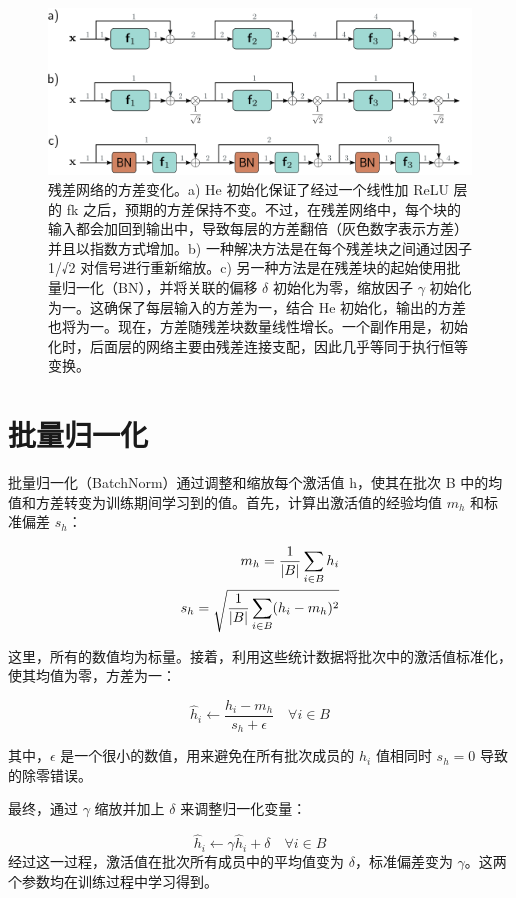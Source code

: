 \begin{figure}[ht!]
\centering
\includegraphics[width=0.7\linewidth]{png/chapter11/ResidualVariance.png}
\caption{残差网络的方差变化。a) He 初始化保证了经过一个线性加 ReLU 层的 fk 之后，预期的方差保持不变。不过，在残差网络中，每个块的输入都会加回到输出中，导致每层的方差翻倍（灰色数字表示方差）并且以指数方式增加。b) 一种解决方法是在每个残差块之间通过因子 1/√2 对信号进行重新缩放。c) 另一种方法是在残差块的起始使用批量归一化（BN），并将关联的偏移 \(\delta\) 初始化为零，缩放因子 \(\gamma\) 初始化为一。这确保了每层输入的方差为一，结合 He 初始化，输出的方差也将为一。现在，方差随残差块数量线性增长。一个副作用是，初始化时，后面层的网络主要由残差连接支配，因此几乎等同于执行恒等变换。}
\end{figure}


\section{批量归一化}
批量归一化（BatchNorm）通过调整和缩放每个激活值 h，使其在批次 B 中的均值和方差转变为训练期间学习到的值。首先，计算出激活值的经验均值 \(m_h\) 和标准偏差 \(s_h\)：

\begin{align}
m_h = \frac{1}{|B|} \sum_{i \in B} h_i \notag \\
s_h = \sqrt{\frac{1}{|B|} \sum_{i \in B} (h_i - m_h)^2}  
\end{align}


这里，所有的数值均为标量。接着，利用这些统计数据将批次中的激活值标准化，使其均值为零，方差为一：

\begin{equation}
\hat{h}_i \leftarrow \frac{h_i - m_h}{s_h + \epsilon} \quad \forall i \in B 
\end{equation}

其中，\(\epsilon\) 是一个很小的数值，用来避免在所有批次成员的 \(h_i\) 值相同时 \(s_h = 0\) 导致的除零错误。

最终，通过 \(\gamma\) 缩放并加上 \(\delta\) 来调整归一化变量：

\begin{equation}
\hat{h}_i \leftarrow \gamma\hat{h}_i + \delta \quad \forall i \in B 
\end{equation}
经过这一过程，激活值在批次所有成员中的平均值变为 \(\delta\)，标准偏差变为 \(\gamma\)。这两个参数均在训练过程中学习得到。

